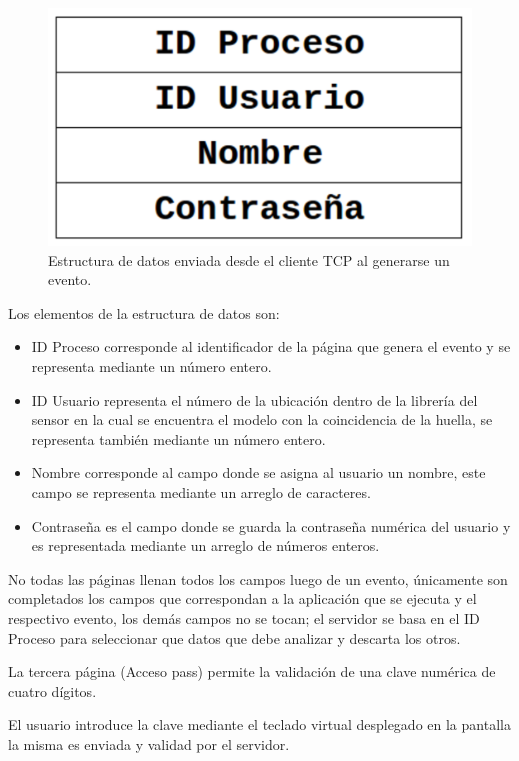\begin{figure}[H]
	\centering
	\includegraphics[scale=.1]{./Figures/estructuradata.png}
	\caption{Estructura de datos enviada desde el cliente TCP al generarse un evento.}
	\label{fig:estructuradata}
\end{figure}

Los elementos de la estructura de datos son:
\begin{itemize}
\item ID Proceso corresponde al identificador de la página que genera el evento y se representa mediante un número entero.
\item ID Usuario representa el número de la ubicación dentro de la librería del sensor en la cual se encuentra el modelo con la coincidencia de la huella, se representa también mediante un número entero.
\item Nombre corresponde al campo donde se asigna al usuario un nombre, este campo se representa mediante un arreglo de caracteres.
\item Contraseña es el campo donde se guarda la contraseña numérica del usuario y es representada mediante un arreglo de números enteros.
\end{itemize}


No todas las páginas llenan todos los campos luego de un evento, únicamente son completados los campos que correspondan a la aplicación que se ejecuta y el respectivo evento, los demás campos no se tocan; el servidor se basa en el ID Proceso para seleccionar que datos que debe analizar y descarta los otros.

La tercera página (Acceso pass) permite la validación de una clave numérica de cuatro dígitos.

El usuario introduce la clave mediante el teclado virtual desplegado en la pantalla	la misma es enviada y validad por el servidor.

